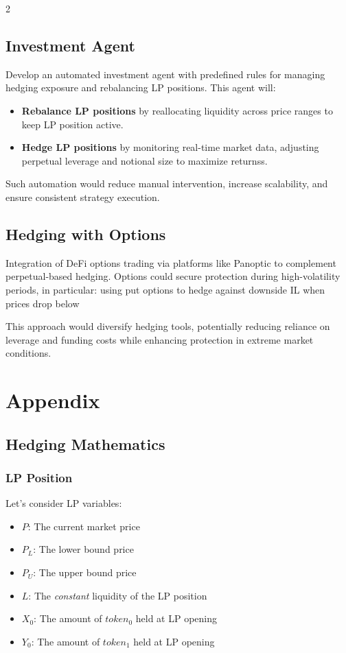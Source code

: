 \documentclass[10pt]{article}
\begin{document}
\begin{multicols}{2}
\subsection{Investment Agent}
Develop an automated investment agent with predefined rules for managing hedging exposure and rebalancing LP positions. This agent will:
\begin{itemize}
	\item \textbf{Rebalance LP positions} by reallocating liquidity across price ranges to keep LP position active.
	\item \textbf{Hedge LP positions} by monitoring real-time market data, adjusting perpetual leverage and notional size to maximize returnss.
\end{itemize}
Such automation would reduce manual intervention, increase scalability, and ensure consistent strategy execution.

\subsection{Hedging with Options}
Integration of DeFi options trading via platforms like Panoptic to complement perpetual-based hedging. Options could secure protection during high-volatility periods, in particular: using put options to hedge against downside IL when prices drop below 

\medskip

This approach would diversify hedging tools, potentially reducing reliance on leverage and funding costs while enhancing protection in extreme market conditions.

\newpage

\section{Appendix}

\bigskip

\subsection{Hedging Mathematics}
\medskip
\subsubsection{LP Position}
Let's consider LP variables:

\begin{itemize}
	\item $P$: The current market price
	\item $P_L$: The lower bound price
	\item $P_U$: The upper bound price
	\item $L$: The \emph{constant} liquidity of the LP position
	\item $X_0$: The amount of $token_0$ held at LP opening
	\item $Y_0$: The amount of $token_1$ held at LP opening
\end{itemize}


\end{multicols}
\end{document}
